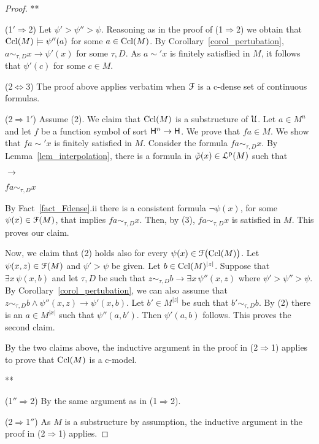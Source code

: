 \documentclass[10pt,oneside]{amsproc}
\begin{document}
{\begin{proof}
\hfil***

  (1$'\!\Rightarrow$2)
  Let $\psi'>\psi''>\psi$.
  Reasoning as in the proof of (1$\Rightarrow$2) we obtain that ${\rm Ccl}(M)\models\psi''(a)$ for some $a\in{\rm Ccl}(M)$.
  By Corollary~\ref{corol_pertubation}, $a\sim_{\tau,D}x\rightarrow\psi'(x)$ for some $\tau,D$.
  As $a\sim'x$ is finitely satisflied in $M$, it follows that $\psi'(c)$ for some $c\in M$.

  (2$\Leftrightarrow$3)
  The proof above applies verbatim when ${\EuScript F}$ is a c-dense set of continuous formulas.
  
  (2$\Rightarrow$1$'$)
  Assume (2).
  We claim that ${\rm Ccl}(M)$ is a substructure of ${\EuScript U}$.  
  Let $a\in M^{n}$ and let $f$ be a function symbol of sort ${\sf H}^{n}\to{\sf H}$.
  We prove that $fa\in M$.
  We show that $fa\sim' x$ is finitely satisfied in $M$.
  Consider the formula $fa\sim_{\tau,D} x$.
  By Lemma~\ref{lem_interpolation}, there is a formula in $\tilde{\varphi}(x)\in{\EuScript L}^{\rm p}(M)$ such that
  
  \parbox{6ex}{\hfil$\rightarrow$}$fa\sim_{\tau,D} x$

  By Fact~\ref{fact_Fdense}.ii there is a consistent formula  $\neg\psi(x)$, for some $\psi(x)\in{\EuScript F}(M)$, that implies $fa\sim_{\tau,D} x$.
  Then, by (3), $fa\sim_{\tau,D} x$ is satisfied in $M$.
  This proves our claim.

  Now, we claim that (2) holds also for every $\psi(x)\in{\EuScript F}\big({\rm Ccl}(M)\big)$.
  Let $\psi(x,z)\in{\EuScript F}(M)$ and $\psi'>\psi$ be given.
  Let $b\in{\rm Ccl}(M)^{|z|}$.
  Suppose that $\exists x\,\psi(x,b)$ and let $\tau,D$ be such that $z\sim_{\tau,D}b\rightarrow\exists x\,\psi''(x,z)$ where $\psi'>\psi''>\psi$.
  By Corollary~\ref{corol_pertubation}, we can also assume that $z\sim_{\tau,D}b\wedge\psi''(x,z)\rightarrow\psi'(x,b)$. 
  Let $b'\in M^{|z|}$ be such that $b'\sim_{\tau,D}b$.
  By (2) there is an $a\in M^{|x|}$ such that $\psi''(a,b')$.
  Then $\psi'(a,b)$ follows.
  This proves the second claim.

  By the two claims above, the inductive argument in the proof in (2$\Rightarrow$1) applies to prove that ${\rm Ccl}(M)$ is a c-model.

  \hfil***

  (1$''\!\Rightarrow$2) By the same argument as in (1$\Rightarrow$2).


  (2$\Rightarrow$1$''$) As $M$ is a substructure by assumption, the inductive argument in the proof in (2$\Rightarrow$1) applies.
\end{proof}


}
\end{document}
